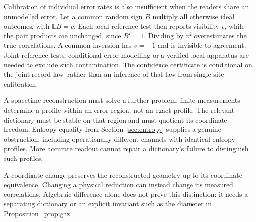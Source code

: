 \documentclass[12pt,a4paper]{article}
\begin{document}
Calibration of individual error rates is also insufficient when
the readers share an unmodelled error. Let a common random sign
$B$ multiply all otherwise ideal outcomes, with $\mathbb E B=v$.
Each local reference test then reports visibility $v$, while the
pair products are unchanged, since $B^2=1$. Dividing by $v^2$
overestimates the true correlations. A common inversion has $v=-1$
and is invisible to agreement. Joint reference tests, conditional
error modelling or a verified local apparatus are needed to exclude
such contamination. The confidence certificate is conditional on
the joint record law, rather than an inference of that law from
single-site calibration.

A spacetime reconstruction must solve a further problem: finite
measurements determine a profile within an error region, not an
exact profile. The relevant dictionary must be stable on that
region and must quotient its coordinate freedom. Entropy equality
from Section~\ref{sec:entropy} supplies a genuine obstruction,
including operationally different channels with identical entropy
profiles. More accurate readout cannot repair a dictionary's
failure to distinguish such profiles.

A coordinate change preserves the reconstructed geometry up to its coordinate equivalence. Changing a physical reduction can instead change its measured correlations. Algebraic difference alone does not prove this distinction: it needs a separating dictionary or an explicit invariant such as the diameter in Proposition~\ref{prop:ghz}.
\end{document}
